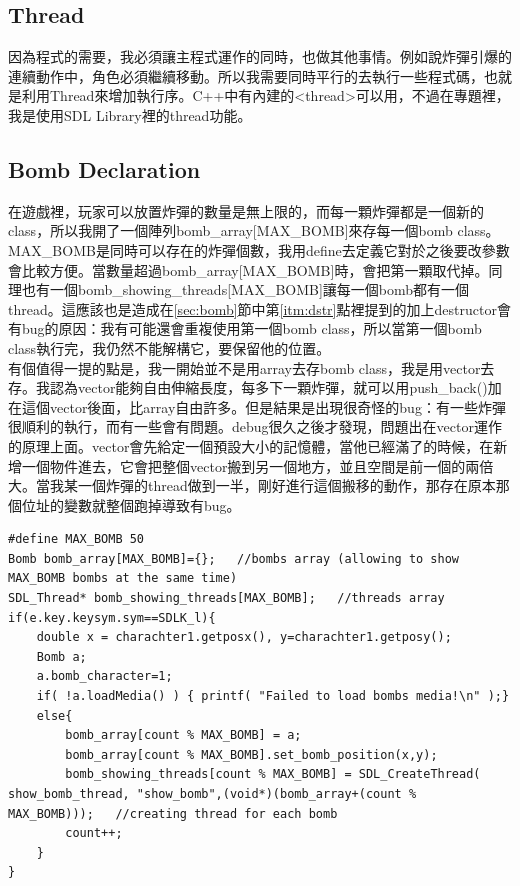\documentclass[a4paper]{article}
\theoremstyle{mystyle}	%
\begin{document}
\subsection{Thread}
因為程式的需要，我必須讓主程式運作的同時，也做其他事情。例如說炸彈引爆的連續動作中，角色必須繼續移動。所以我需要同時平行的去執行一些程式碼，也就是利用Thread來增加執行序。C++中有內建的<thread>可以用，不過在專題裡，我是使用SDL Library裡的thread功能。
\subsection{Bomb Declaration}
在遊戲裡，玩家可以放置炸彈的數量是無上限的，而每一顆炸彈都是一個新的class，所以我開了一個陣列{\codefont \small bomb\_array[MAX\_BOMB]}來存每一個bomb class。{\codefont \small MAX\_BOMB}是同時可以存在的炸彈個數，我用define去定義它對於之後要改參數會比較方便。當數量超過{\codefont \small bomb\_array[MAX\_BOMB]}時，會把第一顆取代掉。同理也有一個{\codefont \small bomb\_showing\_threads[MAX\_BOMB]}讓每一個bomb都有一個thread。這應該也是造成在{\color{blue}\ref{sec:bomb}}節中第{\color{blue}\ref{itm:dstr}}點裡提到的加上destructor會有bug的原因：我有可能還會重複使用第一個bomb class，所以當第一個bomb class執行完，我仍然不能解構它，要保留他的位置。\\
有個值得一提的點是，我一開始並不是用array去存bomb class，我是用vector去存。我認為vector能夠自由伸縮長度，每多下一顆炸彈，就可以用{\codefont \small push\_back()}加在這個vector後面，比array自由許多。但是結果是出現很奇怪的bug：有一些炸彈很順利的執行，而有一些會有問題。debug很久之後才發現，問題出在vector運作的原理上面。vector會先給定一個預設大小的記憶體，當他已經滿了的時候，在新增一個物件進去，它會把整個vector搬到另一個地方，並且空間是前一個的兩倍大。當我某一個炸彈的thread做到一半，剛好進行這個搬移的動作，那存在原本那個位址的變數就整個跑掉導致有bug。\\
\begin{codefont}
\begin{lstlisting}[otherkeywords={Bomb, SDL_Thread*}, caption={main.cpp 71-75, 234-245}]
#define MAX_BOMB 50
Bomb bomb_array[MAX_BOMB]={};   //bombs array (allowing to show MAX_BOMB bombs at the same time)
SDL_Thread* bomb_showing_threads[MAX_BOMB];   //threads array
if(e.key.keysym.sym==SDLK_l){
    double x = charachter1.getposx(), y=charachter1.getposy();
    Bomb a;
    a.bomb_character=1;
    if( !a.loadMedia() ) { printf( "Failed to load bombs media!\n" );}
    else{
        bomb_array[count % MAX_BOMB] = a;
        bomb_array[count % MAX_BOMB].set_bomb_position(x,y);
        bomb_showing_threads[count % MAX_BOMB] = SDL_CreateThread( show_bomb_thread, "show_bomb",(void*)(bomb_array+(count %  MAX_BOMB)));   //creating thread for each bomb
        count++;
    }
}
\end{lstlisting}
\end{codefont}
\end{document}

